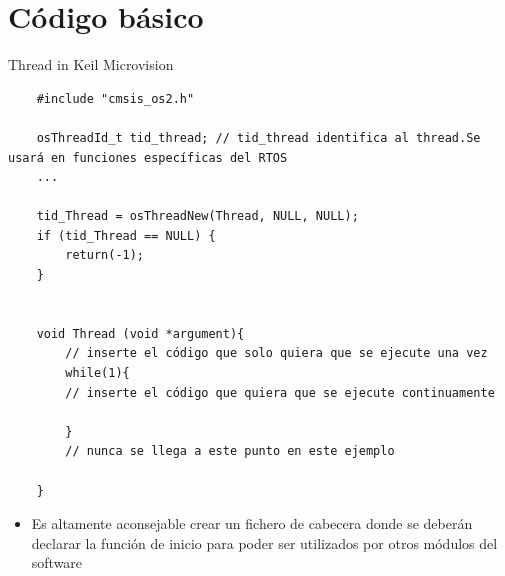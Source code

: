 \section{Código básico}
\begin{frame}[fragile]{Thread in Keil Microvision}
    \begin{verbatim}
    #include "cmsis_os2.h"
    
    osThreadId_t tid_thread; // tid_thread identifica al thread.Se usará en funciones específicas del RTOS
    ...
    
    tid_Thread = osThreadNew(Thread, NULL, NULL);
    if (tid_Thread == NULL) {
        return(-1);
    }


    void Thread (void *argument){
        // inserte el código que solo quiera que se ejecute una vez
        while(1){
        // inserte el código que quiera que se ejecute continuamente
        
        }
        // nunca se llega a este punto en este ejemplo
    
    }
    \end{verbatim}
    \begin{itemize}
        \item Es altamente aconsejable crear un fichero de cabecera donde se deberán declarar la función de inicio para poder ser utilizados por otros módulos del software

    \end{itemize}
\end{frame}

